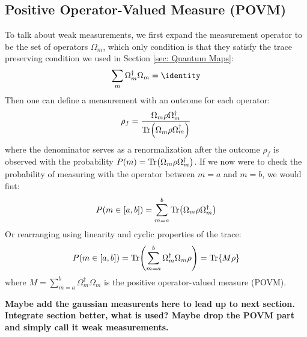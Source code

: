 \subsection{Positive Operator-Valued Measure (POVM)}
To talk about weak measurements, we first expand the measurement operator to be the set of operators $\Omega_m$, which only condition is that they satisfy the trace preserving condition we used in Section \ref{sec: Quantum Maps}: 
\begin{equation}
    \sum_m \Omega_m^\dagger \Omega_m = \identity 
\end{equation}
Then one can define a measurement with an outcome for each operator:
\begin{equation}
    \rho_f = \frac{\Omega_m\rho\Omega_m^\dagger}{\Tr(\Omega_m \rho \Omega_m^\dagger)}
\end{equation}
where the denominator serves as a renormalization after the outcome $\rho_f$ is observed with the probability $P(m) = \Tr(\Omega_m \rho \Omega_m^\dagger)$. If we now were to check the probability of measuring with the operator between $m = a$ and $m = b$, we would fint:
\begin{equation}
    P(m \in [a, b]) = \sum_{m = a}^b \Tr(\Omega_m\rho\Omega_m^\dagger)
\end{equation}
Or rearranging using linearity and cyclic properties of the trace:
\begin{equation}
    P(m \in [a, b]) = \Tr( \sum_{m = a}^b \Omega_m^\dagger \Omega_m\rho) = \Tr{M \rho}
\end{equation}
where $M = \sum_{m = a}^b \Omega_m^\dagger \Omega_m$ is the positive operator-valued measure (POVM).

\noindent
\textbf{Maybe add the gaussian measurents here to lead up to next section. Integrate section better, what is used? Maybe drop the POVM part and simply call it weak measurements.}

